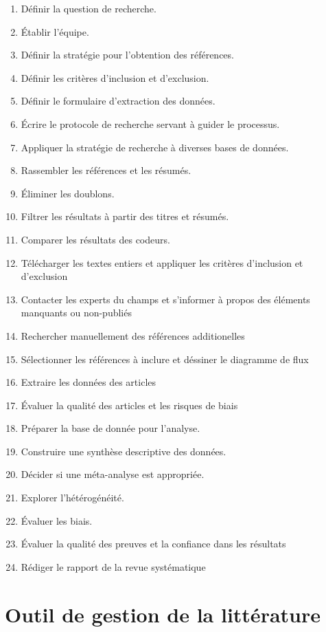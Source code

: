 \documentclass[
  letterpaper,
]{scrbook}
\providecommand{\tightlist}{%
  \setlength{\itemsep}{0pt}\setlength{\parskip}{0pt}}\usepackage{longtable,booktabs,array}
\begin{document}
\begin{enumerate}
\def\labelenumi{\arabic{enumi}.}
\tightlist
\item
  Définir la question de recherche.
\item
  Établir l'équipe.
\item
  Définir la stratégie pour l'obtention des références.
\item
  Définir les critères d'inclusion et d'exclusion.
\item
  Définir le formulaire d'extraction des données.
\item
  Écrire le protocole de recherche servant à guider le processus.
\item
  Appliquer la stratégie de recherche à diverses bases de données.
\item
  Rassembler les références et les résumés.
\item
  Éliminer les doublons.
\item
  Filtrer les résultats à partir des titres et résumés.
\item
  Comparer les résultats des codeurs.
\item
  Télécharger les textes entiers et appliquer les critères d'inclusion
  et d'exclusion
\item
  Contacter les experts du champs et s'informer à propos des éléments
  manquants ou non-publiés
\item
  Rechercher manuellement des références additionelles
\item
  Sélectionner les références à inclure et déssiner le diagramme de flux
\item
  Extraire les données des articles
\item
  Évaluer la qualité des articles et les risques de biais
\item
  Préparer la base de donnée pour l'analyse.
\item
  Construire une synthèse descriptive des données.
\item
  Décider si une méta-analyse est appropriée.
\item
  Explorer l'hétérogénéité.
\item
  Évaluer les biais.
\item
  Évaluer la qualité des preuves et la confiance dans les résultats
\item
  Rédiger le rapport de la revue systématique
\end{enumerate}

\hypertarget{outil-de-gestion-de-la-littuxe9rature}{%
\section{Outil de gestion de la
littérature}\label{outil-de-gestion-de-la-littuxe9rature}}
\end{document}
